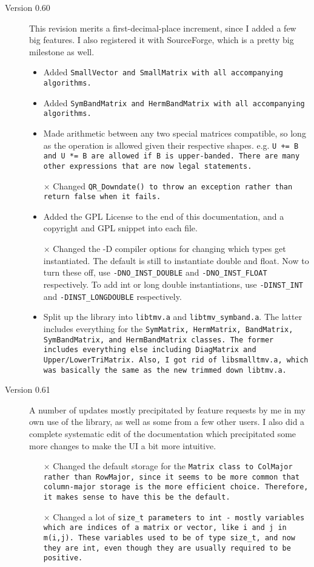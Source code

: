 \begin{description}
\item[Version 0.60]
This revision merits a first-decimal-place increment, since I added a 
few big features.  I also registered it with SourceForge, 
which is a pretty big milestone as well.
\begin{itemize}
\item
Added \tt{SmallVector} and \tt{SmallMatrix} with all accompanying algorithms.
\item 
Added \tt{SymBandMatrix} and \tt{HermBandMatrix} with all accompanying algorithms.
\item
Made arithmetic between any two special matrices compatible, so long as 
the operation is allowed given their respective shapes.  
e.g. \tt{U += B} and \tt{U *= B} are allowed if \tt{B} is upper-banded.  
There are many other expressions that are now legal statements.
\item[$\times$]
Changed \tt{QR\_Downdate()} to throw an exception rather than return false
when it fails.
\item
Added the GPL License to the end of this documentation, and a copyright
and GPL snippet into each file.
\item[$\times$]
Changed the -D compiler options for changing which types get instantiated.
The default is still to instantiate double and float.  Now to turn these
off, use \texttt{-DNO\_INST\_DOUBLE} and \texttt{-DNO\_INST\_FLOAT} respectively.  To
add int or long double instantiations, use \texttt{-DINST\_INT} and 
\texttt{-DINST\_LONGDOUBLE} respectively.
\item
Split up the library into \texttt{libtmv.a} and \texttt{libtmv\_symband.a}.  The
latter includes everything for the \tt{SymMatrix}, \tt{HermMatrix}, 
\tt{BandMatrix}, \tt{SymBandMatrix}, and \tt{HermBandMatrix} classes.
The former includes everything else including \tt{DiagMatrix} and
\tt{Upper/LowerTriMatrix}.  Also, I got rid of \texttt{libsmalltmv.a}, which
was basically the same as the new trimmed down \texttt{libtmv.a}.

\end{itemize}

\item[Version 0.61]
A number of updates mostly precipitated by feature requests by me in my own
use of the library, as well as some from a few other users.
I also did a complete systematic edit of the documentation which 
precipitated some more changes to make the UI a bit more intuitive.
\begin{itemize}
\item[$\times$]
Changed the default storage for the \tt{Matrix} class to \tt{ColMajor}
rather than \tt{RowMajor}, since it seems to be more common that column-major
storage is the more efficient choice.  Therefore, it makes sense to have this
be the default.
\item[$\times$]
Changed a lot of \tt{size\_t} parameters to \tt{int} - mostly variables
which are indices of a matrix or vector, like \tt{i} and \tt{j} in \tt{m(i,j)}.  
These variables used to be of type \tt{size\_t}, and now they are \tt{int},
even though they are usually required to be positive.


\end{itemize}
\end{description}

